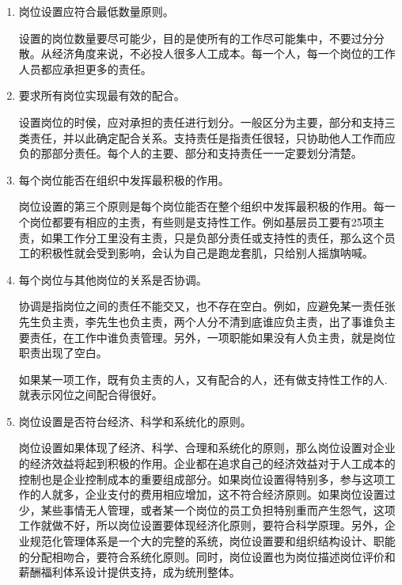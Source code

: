         \begin{enumerate}
            \item 岗位设置应符合最低数量原则。

            设置的岗位数量要尽可能少，目的是使所有的工作尽可能集中，不要过分分散。从经济角度来说，不必投人很多人工成本。每一个人，每一个岗位的工作人员都应承担更多的责任。

            \item 要求所有岗位实现最有效的配合。

            设置岗位的时侯，应对承担的责任进行划分。一般区分为主要，部分和支持三类责任，并以此确定配合关系。支持责任是指责任很轻，只协助他人工作而应负的那部分责任。每个人的主要、部分和支持责任一一定要划分清楚。

            \item 每个岗位能否在组织中发挥最积极的作用。

            岗位设置的第三个原则是每个岗位能否在整个组织中发挥最积极的作用。每一个岗位都要有相应的主责，有些则是支持性工作。例如基层员工要有2\~5项主责，如果工作分工里没有主责，只是负部分责任或支持性的责任，那么这个员工的积极性就会受到影响，会认为自己是跑龙套肌，只给别人摇旗呐喊。

            \item 每个岗位与其他岗位的关系是否协调。

            协调是指岗位之间的责任不能交又，也不存在空白。例如，应避免某一责任张先生负主责，李先生也负主责，两个人分不清到底谁应负主责，出了事谁负主要责任，在工作中谁负责管理。另外，一项职能如果没有人负主贵，就是岗位职责出现了空白。

            如果某一项工作，既有负主责的人，又有配合的人，还有做支持性工作的人. 就表示冈位之间配合得很好。

            \item 岗位设置是否符台经济、科学和系统化的原则。

            岗位设置如果体现了经济、科学、合理和系统化的原则，那么岗位设置对企业的经济效益将起到积极的作用。企业都在追求自己的经济效益对于人工成本的控制也是企业控制成本的重要组成部分。如果岗位设置得特别多，参与这项工作的人就多，企业支付的费用相应增加，这不符合经济原则。如果岗位设置过少，某些事情无人管理，或者某一个岗位的员工负担特别重而产生怨气，这项工作就做不好，所以岗位设置要体现经济化原则，要符合科学原理。另外，企业规范化管理体系是一个大的完整的系统，岗位设置要和组织结构设计、职能的分配相吻合，要符合系统化原则。同时，岗位设置也为岗位描述岗位评价和薪酬福利体系设计提供支持，成为统刑整体。
        \end{enumerate}

